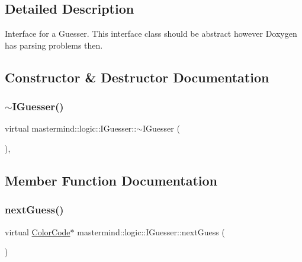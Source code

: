 \subsection{Detailed Description}
Interface for a Guesser. This interface class should be abstract however Doxygen has parsing problems then. 

\subsection{Constructor \& Destructor Documentation}
\hypertarget{classmastermind_1_1logic_1_1_i_guesser_a43ad2f926001589dd454925b839ab106}{}\label{classmastermind_1_1logic_1_1_i_guesser_a43ad2f926001589dd454925b839ab106} 
\subsubsection{\texorpdfstring{$\sim$\+I\+Guesser()}{~IGuesser()}}
{\footnotesize\ttfamily virtual mastermind\+::logic\+::\+I\+Guesser\+::$\sim$\+I\+Guesser (\begin{DoxyParamCaption}{ }\end{DoxyParamCaption})\hspace{0.3cm}{\ttfamily [inline]}, {\ttfamily [virtual]}}



\subsection{Member Function Documentation}
\hypertarget{classmastermind_1_1logic_1_1_i_guesser_a285f709f2076098acb5bc7c49a1435c7}{}\label{classmastermind_1_1logic_1_1_i_guesser_a285f709f2076098acb5bc7c49a1435c7} 
\subsubsection{\texorpdfstring{next\+Guess()}{nextGuess()}}
{\footnotesize\ttfamily virtual \hyperlink{classmastermind_1_1logic_1_1_color_code}{Color\+Code}$\ast$ mastermind\+::logic\+::\+I\+Guesser\+::next\+Guess (\begin{DoxyParamCaption}{ }\end{DoxyParamCaption})\hspace{0.3cm}{\ttfamily [pure virtual]}}




